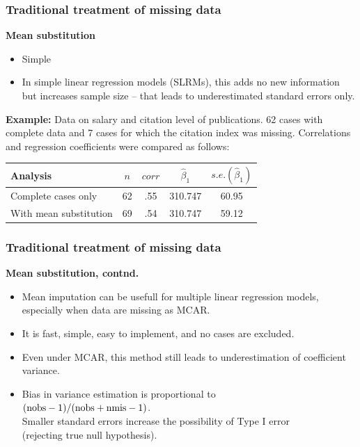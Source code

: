 \documentclass{beamer}
\begin{document}
\begin{frame}
\frametitle{Traditional treatment of missing data}
\textbf{Mean substitution}
\vspace{0.2cm}
  \begin{itemize}
  \item[\ding{51}] Simple
  \item[\ding{55}] In simple linear regression models (SLRMs), this adds no new information but increases sample size – that leads to underestimated standard errors only.
  \end{itemize} 
  \vspace{0.2cm}
\textbf{Example:} Data on salary and citation level of publications. 62 cases with complete data and 7 cases for which the citation index was missing. Correlations and regression coefficients were compared as follows:

\begin{table}
\begin{tabular}{l c c c c}
\toprule
Analysis & $n$ & $corr$ & $\widehat{\beta}_1$ & $\textit{s.e.}(\widehat{\beta}_1)$\\
\midrule
Complete cases only & 62 & .55 &  310.747 & 60.95 \\
With mean substitution & 69 & .54 &  310.747 & 59.12 \\
\bottomrule
\end{tabular}
\end{table}
\end{frame}
\begin{frame}
\frametitle{Traditional treatment of missing data}
\textbf{Mean substitution, contnd.} \\
\medskip
\begin{itemize}
    \item Mean imputation can be usefull for multiple linear regression models, especially when data are missing as MCAR.
    \medskip
    \item It is fast, simple, easy to implement, and no cases are excluded.
    \medskip
    \item Even under MCAR, this method still leads to underestimation of coefficient variance. 
    \medskip
    \item Bias in variance estimation is proportional to \\
    $( \textnormal{nobs} - 1)/( \textnormal{nobs} + \textnormal{nmis} - 1)$. \\ \medskip
    Smaller standard errors increase the possibility of Type I error \\(rejecting true null hypothesis).
\end{itemize}
\end{frame}
\end{document}
